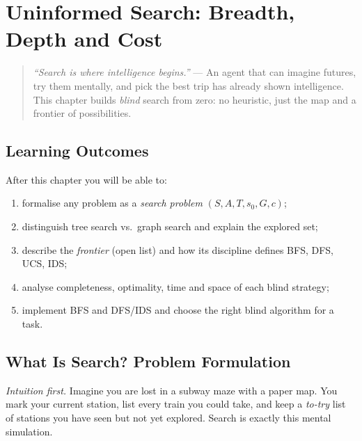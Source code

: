 \chapter{Uninformed Search: Breadth, Depth and Cost}
\label{ch:uninformed}

\begin{quote}
\emph{``Search is where intelligence begins.''} --- An agent that can imagine futures, try them mentally, and pick the best trip has already shown intelligence. This chapter builds \emph{blind} search from zero: no heuristic, just the map and a frontier of possibilities.
\end{quote}

\noindent{}
\vspace{0.4em}

\section*{Learning Outcomes}
After this chapter you will be able to:
\begin{enumerate}[label=(L\arabic*)]
    \item formalise any problem as a \emph{search problem} $(S,A,T,s_0,G,c)$;
    \item distinguish tree search vs.\ graph search and explain the explored set;
    \item describe the \emph{frontier} (open list) and how its discipline defines BFS, DFS, UCS, IDS;
    \item analyse completeness, optimality, time and space of each blind strategy;
    \item implement BFS and DFS/IDS and choose the right blind algorithm for a task.
\end{enumerate}

\section{What Is Search? Problem Formulation}
\label{sec:search-formulation}
\emph{Intuition first.} Imagine you are lost in a subway maze with a paper map. You mark your current station, list every train you could take, and keep a \emph{to-try} list of stations you have seen but not yet explored. Search is exactly this mental simulation.

